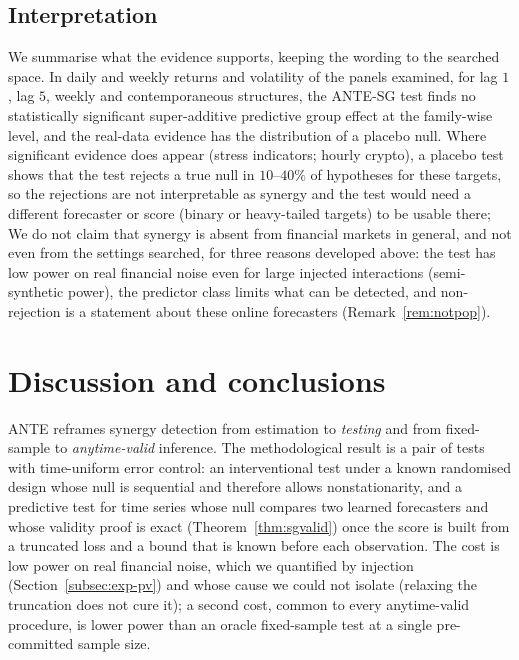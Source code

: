 \documentclass[pdflatex,sn-mathphys-ay]{sn-jnl}%
\theoremstyle{thmstyleone}%
\theoremstyle{thmstyletwo}%
\theoremstyle{thmstylethree}%
\begin{document}
\subsection{Interpretation}\label{subsec:exp-interp}

We summarise what the evidence supports, keeping the wording to the searched space. In daily and weekly returns and volatility of the panels examined, for lag $1$, lag $5$, weekly and contemporaneous structures, the ANTE-SG test finds no statistically significant super-additive predictive group effect
at the family-wise level, and the real-data evidence has the distribution of a placebo null. Where significant evidence does appear (stress indicators; hourly crypto), a placebo test shows that the test rejects a true null in $10$--$40\%$ of hypotheses for these targets, so the rejections are not interpretable as synergy and the test would need a different forecaster or score (binary or heavy-tailed targets) to be usable there;
We do not claim that synergy is absent from financial markets in general, and not even from the settings searched, for three reasons developed above: the test has low power on real financial noise even for large injected interactions (semi-synthetic power), the predictor class limits what can be detected,
and non-rejection is a statement about these online forecasters (Remark~\ref{rem:notpop}).

\section{Discussion and conclusions}\label{sec:discussion}

ANTE reframes synergy detection from estimation to \emph{testing} and from fixed-sample to \emph{anytime-valid} inference. The methodological result is a pair of tests with time-uniform error control: an interventional test under a known randomised design
whose null is sequential and therefore allows nonstationarity, and a predictive test for time series whose null compares two learned forecasters and whose validity proof is exact (Theorem~\ref{thm:sgvalid}) once the score is built from a truncated loss and
a bound that is known before each observation. The cost is low power on real financial noise, which we quantified by injection (Section~\ref{subsec:exp-pv}) and whose cause we could not isolate (relaxing the truncation does not cure it); a second cost, common to every
anytime-valid procedure, is lower power than an oracle fixed-sample test at a single pre-committed sample size.
\end{document}
